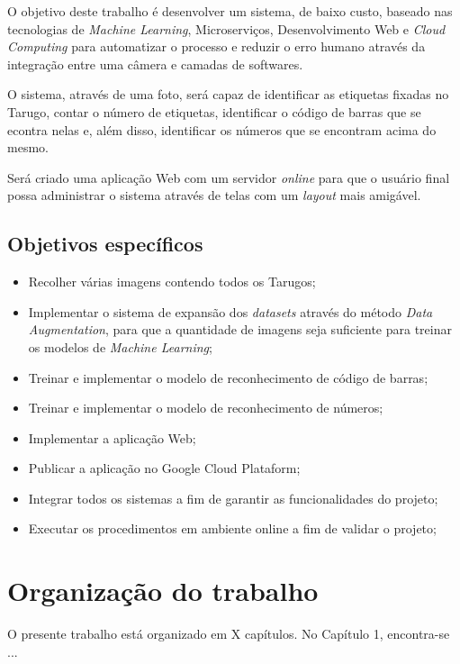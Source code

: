 O objetivo deste trabalho é desenvolver um sistema, de baixo custo, baseado nas tecnologias de \textit{Machine Learning}, Microserviços, Desenvolvimento Web e \textit{Cloud Computing} para automatizar o processo e reduzir o erro humano através da integração entre uma câmera e camadas de softwares. 

O sistema, através de uma foto, será capaz de identificar as etiquetas fixadas no Tarugo, contar o número de etiquetas, identificar o código de barras que se econtra nelas e, além disso, identificar os números que se encontram acima do mesmo.

Será criado uma aplicação Web com um servidor \textit{online} para que o usuário final possa administrar o sistema através de telas com um \textit{layout} mais amigável.

\subsection{Objetivos específicos}

\begin{itemize}
	\item Recolher várias imagens contendo todos os Tarugos;
	\item Implementar o sistema de expansão dos \textit{datasets} através do método \textit{Data Augmentation}, para que a quantidade de imagens seja suficiente para treinar os modelos de \textit{Machine Learning};
	\item Treinar e implementar o modelo de reconhecimento de código de barras;
	\item Treinar e implementar o modelo de reconhecimento de números;
	\item Implementar a aplicação Web;
	\item Publicar a aplicação no Google Cloud Plataform;
	\item Integrar todos os sistemas a fim de garantir as funcionalidades do projeto;
	\item Executar os procedimentos em ambiente online a fim de validar o projeto;
\end{itemize}


\section{Organização do trabalho}

O presente trabalho está organizado em X capítulos. No Capítulo 1, encontra-se ... 